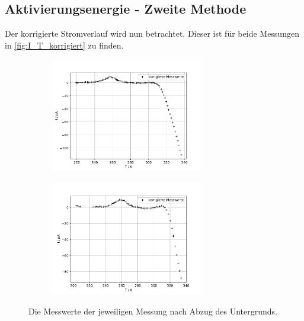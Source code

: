 \subsection{Aktivierungsenergie - Zweite Methode}
  Der korrigierte Stromverlauf wird nun betrachtet.
  Dieser ist für beide Messungen in \autoref{fig:I_T_korrigiert} zu finden.

  \begin{figure}[H]
    \begin{subfigure}[b]{.5\linewidth}
      \centering
      \includegraphics[height=5cm, keepaspectratio]{build/korrigierte_werte_1.pdf}
    \end{subfigure}
    \begin{subfigure}[b]{.5\linewidth}
      \centering
      \includegraphics[height=5cm, keepaspectratio]{build/korrigierte_werte_2.pdf}
    \end{subfigure}
    \caption{Die Messwerte der jeweiligen Messung nach Abzug des Untergrunds.}
    \label{fig:I_T_korrigiert}
  \end{figure} %

